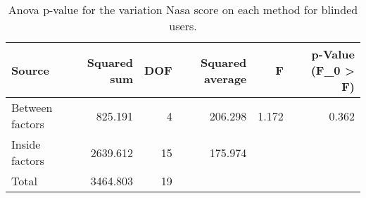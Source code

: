 
\begin{table}[!htb]
\centering
\caption{Anova p-value for the variation Nasa score on each method for blinded users.}
\label{tab:anova_nasa_var}
\begin{tabular}{lrrrrr}
\toprule
         Source &  Squared sum &  DOF & Squared average &     F & p-Value (F\_0 > F) \\
\midrule
Between factors &      825.191 &    4 &         206.298 & 1.172 &             0.362 \\
 Inside factors &     2639.612 &   15 &         175.974 &       &                   \\
          Total &     3464.803 &   19 &                 &       &                   \\
\bottomrule
\end{tabular}
\end{table}

